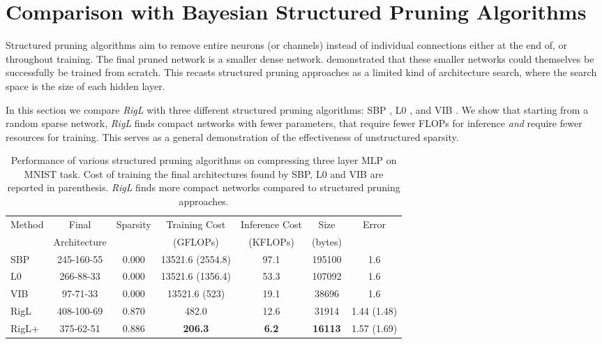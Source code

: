 \documentclass{article}
\begin{document}
\section{Comparison with Bayesian Structured Pruning Algorithms}
\label{app:mnist}
Structured pruning algorithms aim to remove entire neurons (or channels) instead of individual connections either at the end of, or throughout training. The final pruned network is a smaller dense network. \citet{Liu2018} demonstrated that these smaller networks could themselves be successfully be trained from scratch. This recasts structured pruning approaches as a limited kind of architecture search, where the search space is the size of each hidden layer.

In this section we compare \textit{RigL} with three different structured pruning algorithms: SBP \citep{sbp2017}, L0 \citep{Louizos2018}, and VIB \citep{vib2018}. We show that starting from a random sparse network, \textit{RigL} finds compact networks with fewer parameters, that require fewer FLOPs for inference \emph{and} require fewer resources for training. This serves as a general demonstration of the effectiveness of unstructured sparsity.

\begin{table*}
    \centering
    \begin{tabular}{l|cccccc}\toprule

    Method      & Final  & Sparsity  & Training Cost & Inference Cost& Size & Error \\
          & Architecture  &   & (GFLOPs) & (KFLOPs) & (bytes) &  \\
\midrule
SBP	& 245-160-55	& 0.000	& 13521.6 (2554.8)	& 97.1	& 195100	& 1.6	 \\
L0	& 266-88-33	& 0.000	& 13521.6 (1356.4) & 53.3	& 107092	& 1.6	 \\
VIB	& 97-71-33	& 0.000	& 13521.6 (523) & 19.1	& 38696	& 1.6	 \\
RigL	& 408-100-69	& 0.870	& 482.0	& 12.6	& 31914	& 1.44 (1.48)	 \\
RigL+	& 375-62-51	& 0.886	& \textbf{206.3}	& \textbf{6.2}	& \textbf{16113}	& 1.57 (1.69)	 \\
\bottomrule    \end{tabular}
    \caption{Performance of various structured pruning algorithms on compressing three layer MLP on MNIST task. Cost of training the final architectures found by SBP, L0 and VIB are reported in parenthesis. \textit{RigL} finds more compact networks compared to structured pruning approaches.}
    \label{tab:app:mnist}
\end{table*}
\end{document}
